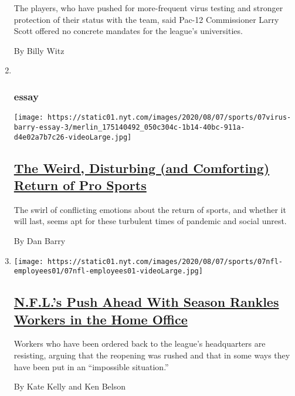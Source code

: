 \begin{enumerate}
  The players, who have pushed for more-frequent virus testing and
  stronger protection of their status with the team, said Pac-12
  Commissioner Larry Scott offered no concrete mandates for the league's
  universities.

  By Billy Witz
\item ~
  \hypertarget{essay}{%
  \subsubsection{essay}\label{essay}}

  \texttt{[image: https://static01.nyt.com/images/2020/08/07/sports/07virus-barry-essay-3/merlin\_175140492\_050c304c-1b14-40bc-911a-d4e02a7b7c26-videoLarge.jpg]}

  \hypertarget{the-weird-disturbing-and-comforting-return-of-pro-sports}{%
  \subsection{\texorpdfstring{\href{/2020/08/07/sports/coronavirus-restart-nba-baseball.html}{The
  Weird, Disturbing (and Comforting) Return of Pro
  Sports}}{The Weird, Disturbing (and Comforting) Return of Pro Sports}}\label{the-weird-disturbing-and-comforting-return-of-pro-sports}}

  The swirl of conflicting emotions about the return of sports, and
  whether it will last, seems apt for these turbulent times of pandemic
  and social unrest.

  By Dan Barry
\item
  \texttt{[image: https://static01.nyt.com/images/2020/08/07/sports/07nfl-employees01/07nfl-employees01-videoLarge.jpg]}

  \hypertarget{nfls-push-ahead-with-season-rankles-workers-in-the-home-office}{%
  \subsection{\texorpdfstring{\href{/2020/08/07/sports/football/coronavirus-nfl-restart-season.html}{N.F.L.'s
  Push Ahead With Season Rankles Workers in the Home
  Office}}{N.F.L.'s Push Ahead With Season Rankles Workers in the Home Office}}\label{nfls-push-ahead-with-season-rankles-workers-in-the-home-office}}

  Workers who have been ordered back to the league's headquarters are
  resisting, arguing that the reopening was rushed and that in some ways
  they have been put in an ``impossible situation.''

  By Kate Kelly and Ken Belson
\end{enumerate}

